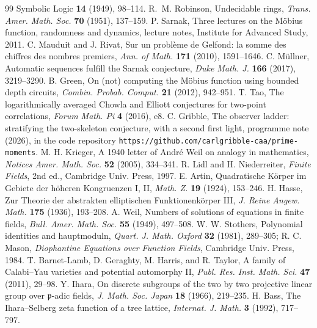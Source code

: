 \documentclass[11pt]{article}
\theoremstyle{remark}
\begin{document}
\begin{thebibliography}{99}
{Symbolic Logic} \textbf{14} (1949), 98--114.
 R.~M. Robinson, Undecidable rings, \emph{Trans. Amer. Math. Soc.}
\textbf{70} (1951), 137--159.
 P. Sarnak, Three lectures on the M\"obius function, randomness and dynamics, lecture
notes, Institute for Advanced Study, 2011.
 C. Mauduit and J. Rivat, Sur un probl\`eme de Gelfond: la somme des chiffres
des nombres premiers, \emph{Ann. of Math.} \textbf{171} (2010), 1591--1646.
 C. M\"ullner, Automatic sequences fulfill the Sarnak conjecture, \emph{Duke Math.
J.} \textbf{166} (2017), 3219--3290.
 B. Green, On (not) computing the M\"obius function using bounded depth circuits,
\emph{Combin. Probab. Comput.} \textbf{21} (2012), 942--951.
 T. Tao, The logarithmically averaged Chowla and Elliott conjectures for
two-point correlations, \emph{Forum Math. Pi} \textbf{4} (2016), e8.
 C. Gribble, The observer ladder: stratifying the two-skeleton conjecture, with a
second first light, programme note (2026), in the code repository
\texttt{https://github.com/carlgribble-caa/prime-moments}.
 M. H. Krieger, A 1940 letter of Andr\'e Weil on analogy in mathematics,
\emph{Notices Amer. Math. Soc.} \textbf{52} (2005), 334--341.
 R. Lidl and H. Niederreiter, \emph{Finite Fields}, 2nd ed., Cambridge
Univ. Press, 1997.
 E. Artin, Quadratische K\"orper im Gebiete der h\"oheren Kongruenzen I, II,
\emph{Math. Z.} \textbf{19} (1924), 153--246.
 H. Hasse, Zur Theorie der abstrakten elliptischen Funktionenk\"orper III, \emph{J.
Reine Angew. Math.} \textbf{175} (1936), 193--208.
 A. Weil, Numbers of solutions of equations in finite fields, \emph{Bull. Amer.
Math. Soc.} \textbf{55} (1949), 497--508.
 W. W. Stothers, Polynomial identities and hauptmoduln, \emph{Quart. J.
Math. Oxford} \textbf{32} (1981), 289--305; R. C. Mason, \emph{Diophantine Equations over Function
Fields}, Cambridge Univ. Press, 1984.
 T. Barnet-Lamb, D. Geraghty, M. Harris, and R. Taylor, A family of Calabi--Yau
varieties and potential automorphy II, \emph{Publ. Res. Inst. Math. Sci.} \textbf{47} (2011),
29--98.
 Y. Ihara, On discrete subgroups of the two by two projective linear group over
$\mathfrak{p}$-adic fields, \emph{J. Math. Soc. Japan} \textbf{18} (1966), 219--235.
 H. Bass, The Ihara--Selberg zeta function of a tree lattice, \emph{Internat. J.
Math.} \textbf{3} (1992), 717--797.

\end{thebibliography}
\end{document}
